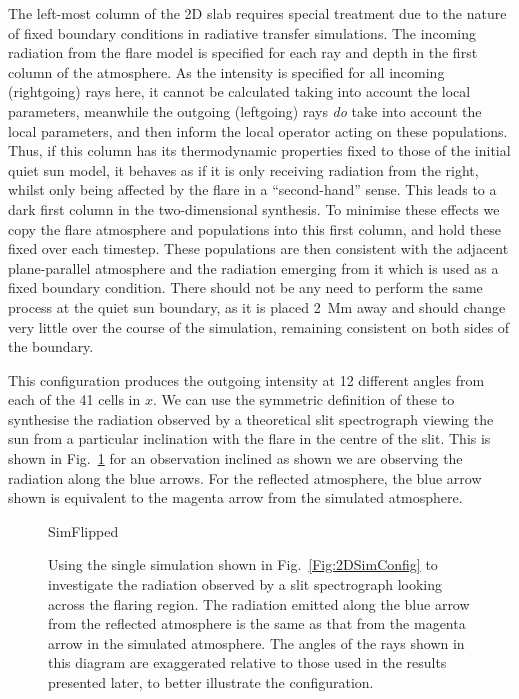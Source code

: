 The left-most column of the 2D slab requires special treatment due to the nature of fixed boundary conditions in radiative transfer simulations.
The incoming radiation from the flare model is specified for each ray and depth in the first column of the atmosphere.
As the intensity is specified for all incoming (rightgoing) rays here, it cannot be calculated taking into account the local parameters, meanwhile the outgoing (leftgoing) rays \emph{do} take into account the local parameters, and then inform the local operator acting on these populations.
Thus, if this column has its thermodynamic properties fixed to those of the initial quiet sun model, it behaves as if it is only receiving radiation from the right, whilst only being affected by the flare in a ``second-hand'' sense.
This leads to a dark first column in the two-dimensional synthesis.
To minimise these effects we copy the flare atmosphere and populations into this first column, and hold these fixed over each timestep.
These populations are then consistent with the adjacent plane-parallel atmosphere and the radiation emerging from it which is used as a fixed boundary condition.
There should not be any need to perform the same process at the quiet sun boundary, as it is placed \SI{2}{\mega\metre} away and should change very little over the course of the simulation, remaining consistent on both sides of the boundary.

This configuration produces the outgoing intensity at 12 different angles from each of the 41 cells in $x$.
We can use the symmetric definition of these to synthesise the radiation observed by a theoretical slit spectrograph viewing the sun from a particular inclination with the flare in the centre of the slit.
This is shown in Fig.~\ref{Fig:2DSimFlipped} for an observation inclined as shown we are observing the radiation along the blue arrows.
For the reflected atmosphere, the blue arrow shown is equivalent to the magenta arrow from the simulated atmosphere.

\begin{figure}[tbp]
\centering
{SimFlipped}
\caption[Configuration of two-dimensional simulation to produce radiation that would be observed by a slit spectrograph looking across the model flare.]{Using the single simulation shown in Fig.~\ref{Fig:2DSimConfig} to investigate the radiation observed by a slit spectrograph looking across the flaring region. The radiation emitted along the {\color{TolBlue}blue} arrow from the reflected atmosphere is the same as that from the {\color{TolMagenta}magenta} arrow in the simulated atmosphere. The angles of the rays shown in this diagram are exaggerated relative to those used in the results presented later, to better illustrate the configuration.}
\label{Fig:2DSimFlipped}
\end{figure}

